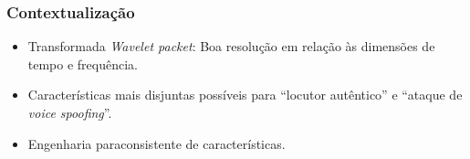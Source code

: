 \begin{frame}
	\frametitle{Contextualização}
	\begin{itemize}
		\item Transformada \textit{Wavelet packet}: Boa resolução em relação às dimensões de tempo e frequência.
		\item Características mais disjuntas possíveis para ``locutor autêntico'' e ``ataque de \textit{voice spoofing}''.
		\item Engenharia paraconsistente de características.
	\end{itemize}
\end{frame}